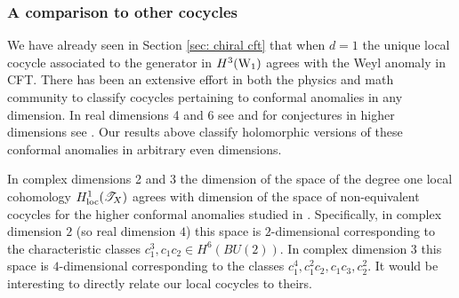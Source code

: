 
\subsubsection{A comparison to other cocycles}

We have already seen in Section \ref{sec: chiral cft} that when $d=1$ the unique local cocycle associated to the generator in $H^3({\rm W}_1)$ agrees with the Weyl anomaly in CFT. 
There has been an extensive effort in both the physics and math community to classify cocycles pertaining to conformal anomalies in any dimension. 
In real dimensions 4 and 6 see \cite{Bonora, KMM} and for conjectures in higher dimensions see \cite{DeserSchwimmer}. 
Our results above classify holomorphic versions of these conformal anomalies in arbitrary even dimensions. 

In complex dimensions 2 and 3 the dimension of the space of the degree one local cohomology $H^1_{\rm loc}(\mathscr T_X)$ agrees with dimension of the space of non-equivalent cocycles for the higher conformal anomalies studied in \cite{Bonora, DeserSchwimmer}. 
Specifically, in complex dimension $2$ (so real dimension $4$) this space is $2$-dimensional corresponding to the characteristic classes $c_1^3, c_1c_2 \in H^6(BU(2))$. 
In complex dimension $3$ this space is $4$-dimensional corresponding to the classes $c_1^4, c_1^2c_2, c_1c_3, c_2^2$. 
It would be interesting to directly relate our local cocycles to theirs. 

